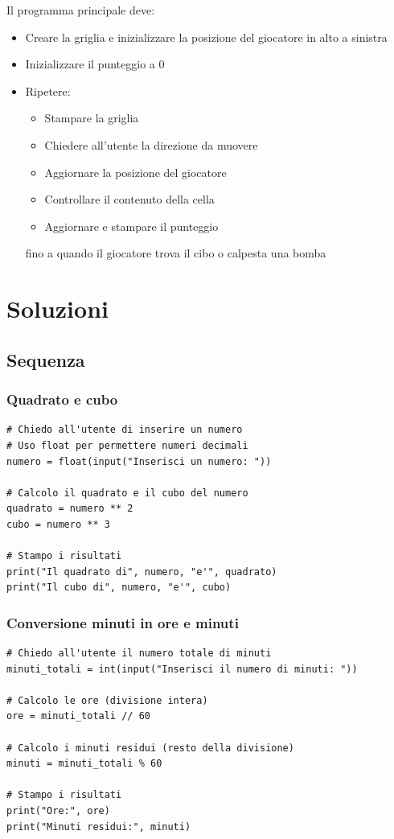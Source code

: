 \documentclass[a4paper,12pt]{article}
\begin{document}
	Il programma principale deve:
	\begin{itemize}
		\item Creare la griglia e inizializzare la posizione del giocatore in alto a sinistra
		\item Inizializzare il punteggio a 0
		\item Ripetere:
		\begin{itemize}
			\item Stampare la griglia
			\item Chiedere all'utente la direzione da muovere
			\item Aggiornare la posizione del giocatore
			\item Controllare il contenuto della cella
			\item Aggiornare e stampare il punteggio
		\end{itemize}
		fino a quando il giocatore trova il cibo o calpesta una bomba
	\end{itemize}
	
	\newpage
	\section{Soluzioni}
	
	\subsection{Sequenza}

	\subsubsection{Quadrato e cubo}
	\begin{lstlisting}
# Chiedo all'utente di inserire un numero
# Uso float per permettere numeri decimali
numero = float(input("Inserisci un numero: "))

# Calcolo il quadrato e il cubo del numero
quadrato = numero ** 2
cubo = numero ** 3
	
# Stampo i risultati
print("Il quadrato di", numero, "e'", quadrato)
print("Il cubo di", numero, "e'", cubo)
	\end{lstlisting}
	

\newpage
	\subsubsection{Conversione minuti in ore e minuti}
	\begin{lstlisting}
# Chiedo all'utente il numero totale di minuti
minuti_totali = int(input("Inserisci il numero di minuti: "))
		
# Calcolo le ore (divisione intera)
ore = minuti_totali // 60
		
# Calcolo i minuti residui (resto della divisione)
minuti = minuti_totali % 60
		
# Stampo i risultati
print("Ore:", ore)
print("Minuti residui:", minuti)
	\end{lstlisting}
	
\end{document}
